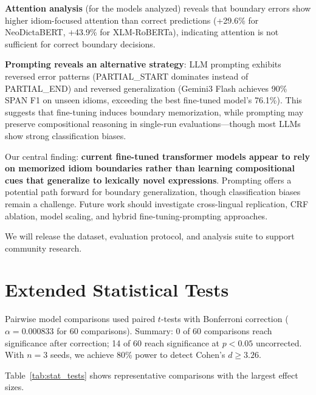 \documentclass[11pt]{article}
\begin{document}
\textbf{Attention analysis} (for the models analyzed) reveals that boundary errors show higher idiom-focused attention than correct predictions (+29.6\% for NeoDictaBERT, +43.9\% for XLM-RoBERTa), indicating attention is not sufficient for correct boundary decisions.

\textbf{Prompting reveals an alternative strategy}: LLM prompting exhibits reversed error patterns (PARTIAL\_START dominates instead of PARTIAL\_END) and reversed generalization (Gemini3 Flash achieves 90\% SPAN F1 on unseen idioms, exceeding the best fine-tuned model's 76.1\%). This suggests that fine-tuning induces boundary memorization, while prompting may preserve compositional reasoning in single-run evaluations---though most LLMs show strong classification biases.

Our central finding: \textbf{current fine-tuned transformer models appear to rely on memorized idiom boundaries rather than learning compositional cues that generalize to lexically novel expressions}. Prompting offers a potential path forward for boundary generalization, though classification biases remain a challenge. Future work should investigate cross-lingual replication, CRF ablation, model scaling, and hybrid fine-tuning-prompting approaches.

We will release the dataset, evaluation protocol, and analysis suite to support community research.




\appendix

\section{Extended Statistical Tests}
\label{sec:appendix_stats}

Pairwise model comparisons used paired $t$-tests with Bonferroni correction ($\alpha = 0.000833$ for 60 comparisons). Summary: 0 of 60 comparisons reach significance after correction; 14 of 60 reach significance at $p < 0.05$ uncorrected. With $n=3$ seeds, we achieve 80\% power to detect Cohen's $d \geq 3.26$.

Table~\ref{tab:stat_tests} shows representative comparisons with the largest effect sizes.
\end{document}

